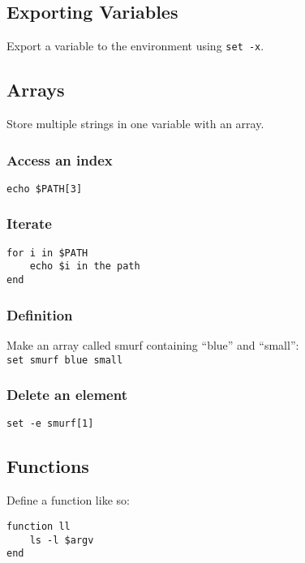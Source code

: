 \documentclass[10pt]{extarticle}
\begin{document}
\begin{paracol}{2}
\subsection*{Exporting Variables}

Export a variable to the environment using \texttt{set -x}.

\subsection*{Arrays}

Store multiple strings in one variable with an array.

\subsubsection*{Access an index}

\texttt{echo \$PATH[3]}

\subsubsection*{Iterate}

\begin{verbatim}
for i in $PATH
    echo $i in the path
end
\end{verbatim}

\subsubsection*{Definition}

Make an array called smurf containing ``blue'' and ``small'':\\

\texttt{set smurf blue small}

\subsubsection*{Delete an element}

\texttt{set -e smurf[1]}

\subsection*{Functions}

Define a function like so:\\

\begin{verbatim}
function ll
    ls -l $argv
end
\end{verbatim}


\end{paracol}
\end{document}
